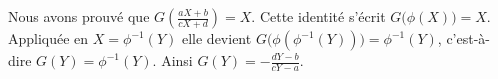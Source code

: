{\begin{enumerate}
{Nous avons prouvé que $G\left( \frac{aX+b}{cX+d}\right) =X$.
Cette identité s'écrit $G\big( \phi(X) \big)=X$.
Appliquée en $X = \phi^{-1}(Y)$ elle devient
$G\big( \phi( \phi^{-1}(Y) ) \big)=\phi^{-1}(Y)$, c'est-à-dire
$G(Y) = \phi^{-1}(Y)$.
Ainsi $G(Y) = -\frac{dY-b}{cY-a}$.}
\end{enumerate}
}
